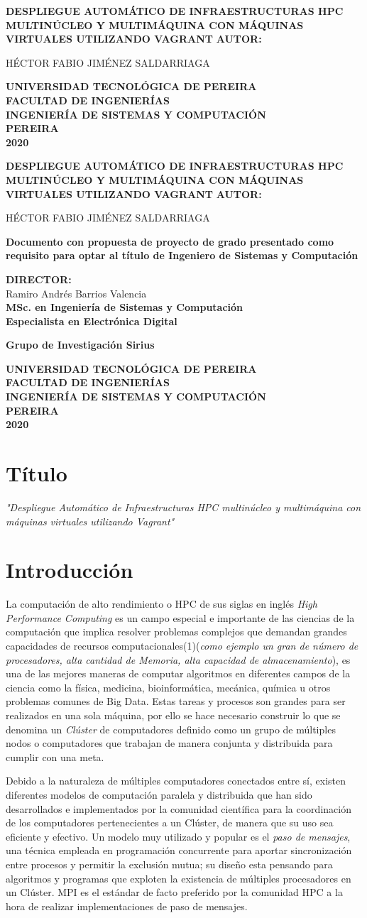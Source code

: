 \documentclass[letterpaper, 12pt, oneside]{article}
\newcommand\portada{
    \begin{titlepage}
		\begin{center}
			{\large \bf DESPLIEGUE AUTOMÁTICO DE INFRAESTRUCTURAS HPC MULTINÚCLEO Y MULTIMÁQUINA CON MÁQUINAS VIRTUALES UTILIZANDO VAGRANT }
			\vfill
  			{\large\bf AUTOR:} \\
			{\large HÉCTOR FABIO JIMÉNEZ SALDARRIAGA \par}
			\vfill
			{\large\bf UNIVERSIDAD TECNOLÓGICA DE PEREIRA} \\
			{\large\bf FACULTAD DE INGENIERÍAS} \\
			{\large\bf INGENIERÍA DE SISTEMAS Y COMPUTACIÓN} \\
			{\large\bf PEREIRA} \\
			{\large\bf 2020}
		\end{center}
	\end{titlepage}
}
\newcommand\contraportada{
\begin{titlepage}
		\begin{center}
			{\large \bf DESPLIEGUE AUTOMÁTICO DE INFRAESTRUCTURAS HPC MULTINÚCLEO Y MULTIMÁQUINA CON MÁQUINAS VIRTUALES UTILIZANDO VAGRANT }
			\vfill
			{\large\bf AUTOR:} \\
			{\large HÉCTOR FABIO JIMÉNEZ SALDARRIAGA\par}
			\vfill
			{\large\bf Documento con propuesta de proyecto de grado presentado como requisito para optar al título de Ingeniero de Sistemas y Computación\par}
			\vfill
			{\large\bf DIRECTOR:} \\
			{\large Ramiro Andrés Barrios Valencia} \\
			{\large\bf MSc. en Ingeniería de Sistemas y Computación} \\
			{\large\bf Especialista en Electrónica Digital} \\
			{\large\bf Grupo de Investigación Sirius\par}
			\vfill
			{\large\bf UNIVERSIDAD TECNOLÓGICA DE PEREIRA} \\
			{\large\bf FACULTAD DE INGENIERÍAS} \\
			{\large\bf INGENIERÍA DE SISTEMAS Y COMPUTACIÓN} \\
			{\large\bf PEREIRA} \\
			{\large\bf 2020}
		\end{center}
	\end{titlepage}
}
\begin{document}
\portada
\contraportada
	\renewcommand{\tablename}{Tabla}
	\renewcommand{\contentsname}{\centering Contenido}
	\tableofcontents
	\newpage
	\renewcommand{\listfigurename}{Lista de Figuras}
    \listoffigures
    \newpage
    \renewcommand{\listtablename}{Lista de Tablas }
    \listoftables
	\clearpage
	
	\section{Título}
	\textit{"Despliegue Automático de Infraestructuras HPC multinúcleo y multimáquina con máquinas virtuales utilizando Vagrant"}

	\section{Introducción}
	
	La computación de alto rendimiento o HPC de sus siglas en inglés \textit{High Performance Computing} es un campo especial e importante de las ciencias de la computación que implica resolver problemas complejos que demandan grandes capacidades de recursos computacionales(1)(\textit{como ejemplo un gran de número de procesadores, alta cantidad de Memoria, alta capacidad de almacenamiento}), es una de las mejores maneras de computar algoritmos en diferentes campos de la ciencia como la física, medicina, bioinformática,  mecánica, química u otros problemas comunes de Big Data. Estas tareas y procesos son  grandes para ser realizados en una sola máquina, por ello se hace necesario construir lo que se denomina un \textit{Clúster} de computadores definido como un grupo de múltiples nodos o computadores que trabajan de manera conjunta y distribuida para cumplir con una meta. 
	
	Debido a la naturaleza de múltiples computadores conectados entre sí, existen diferentes modelos de computación paralela y distribuida que han sido desarrollados e implementados por la comunidad científica para la coordinación de los computadores pertenecientes a un Clúster, de manera que su uso sea eficiente y efectivo. Un modelo muy utilizado y popular es el \textit{paso de mensajes}, una técnica empleada en programación concurrente para aportar sincronización entre procesos y permitir la exclusión mutua; su diseño esta pensando para algoritmos y programas que exploten la existencia de múltiples procesadores en un Clúster. MPI es el estándar de facto preferido por la comunidad HPC a la hora de realizar implementaciones de paso de mensajes.
\end{document}
